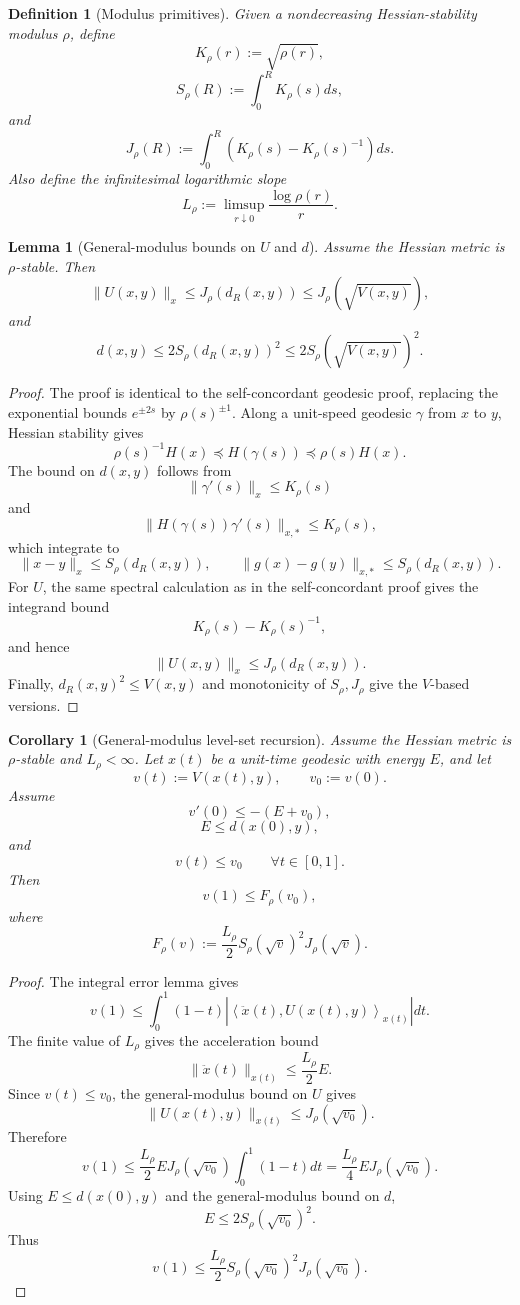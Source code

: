 \documentclass[11pt]{article}
\newtheorem{definition}{Definition}
\newtheorem{lemma}{Lemma}
\newtheorem{corollary}{Corollary}
\newcommand{\ip}[2]{\left\langle #1,#2\right\rangle}
\begin{document}
\begin{definition}[Modulus primitives]
Given a nondecreasing Hessian-stability modulus $\rho$, define
\[
    K_\rho(r):=\sqrt{\rho(r)},
\]
\[
    S_\rho(R):=\int_0^R K_\rho(s)ds,
\]
and
\[
    J_\rho(R):=\int_0^R\left(K_\rho(s)-K_\rho(s)^{-1}\right)ds.
\]
Also define the infinitesimal logarithmic slope
\[
    L_\rho:=\limsup_{r\downarrow0}\frac{\log\rho(r)}{r}.
\]
\end{definition}

\begin{lemma}[General-modulus bounds on $U$ and $d$]
Assume the Hessian metric is $\rho$-stable. Then
\[
    \|U(x,y)\|_x
    \le
    J_\rho(d_R(x,y))
    \le
    J_\rho(\sqrt{V(x,y)}),
\]
and
\[
    d(x,y)
    \le
    2S_\rho(d_R(x,y))^2
    \le
    2S_\rho(\sqrt{V(x,y)})^2.
\]
\end{lemma}

\begin{proof}
The proof is identical to the self-concordant geodesic proof, replacing the exponential bounds $e^{\pm 2s}$ by $\rho(s)^{\pm1}$. Along a unit-speed geodesic $\gamma$ from $x$ to $y$, Hessian stability gives
\[
    \rho(s)^{-1}H(x)
    \preceq
    H(\gamma(s))
    \preceq
    \rho(s)H(x).
\]
The bound on $d(x,y)$ follows from
\[
    \|\gamma'(s)\|_x\le K_\rho(s)
\]
and
\[
    \|H(\gamma(s))\gamma'(s)\|_{x,*}\le K_\rho(s),
\]
which integrate to
\[
    \|x-y\|_x\le S_\rho(d_R(x,y)),
    \qquad
    \|g(x)-g(y)\|_{x,*}\le S_\rho(d_R(x,y)).
\]
For $U$, the same spectral calculation as in the self-concordant proof gives the integrand bound
\[
    K_\rho(s)-K_\rho(s)^{-1},
\]
and hence
\[
    \|U(x,y)\|_x\le J_\rho(d_R(x,y)).
\]
Finally, $d_R(x,y)^2\le V(x,y)$ and monotonicity of $S_\rho,J_\rho$ give the $V$-based versions.
\end{proof}

\begin{corollary}[General-modulus level-set recursion]
Assume the Hessian metric is $\rho$-stable and $L_\rho<\infty$. Let $x(t)$ be a unit-time geodesic with energy $E$, and let
\[
    v(t):=V(x(t),y),
    \qquad
    v_0:=v(0).
\]
Assume
\[
    v'(0)\le -(E+v_0),
\]
\[
    E\le d(x(0),y),
\]
and
\[
    v(t)
    \le
    v_0
    \qquad
    \forall t\in[0,1].
\]
Then
\[
    v(1)
    \le
    F_\rho(v_0),
\]
where
\[
    F_\rho(v)
    :=
    \frac{L_\rho}{2}
    S_\rho(\sqrt v)^2
    J_\rho(\sqrt v).
\]
\end{corollary}

\begin{proof}
The integral error lemma gives
\[
    v(1)
    \le
    \int_0^1(1-t)
    \left|\ip{\ddot x(t)}{U(x(t),y)}_{x(t)}\right|dt.
\]
The finite value of $L_\rho$ gives the acceleration bound
\[
    \|\ddot x(t)\|_{x(t)}
    \le
    \frac{L_\rho}{2}E.
\]
Since $v(t)\le v_0$, the general-modulus bound on $U$ gives
\[
    \|U(x(t),y)\|_{x(t)}
    \le
    J_\rho(\sqrt{v_0}).
\]
Therefore
\[
    v(1)
    \le
    \frac{L_\rho}{2}EJ_\rho(\sqrt{v_0})
    \int_0^1(1-t)dt
    =
    \frac{L_\rho}{4}EJ_\rho(\sqrt{v_0}).
\]
Using $E\le d(x(0),y)$ and the general-modulus bound on $d$,
\[
    E
    \le
    2S_\rho(\sqrt{v_0})^2.
\]
Thus
\[
    v(1)
    \le
    \frac{L_\rho}{2}
    S_\rho(\sqrt{v_0})^2
    J_\rho(\sqrt{v_0}).
\]
\end{proof}
\end{document}
